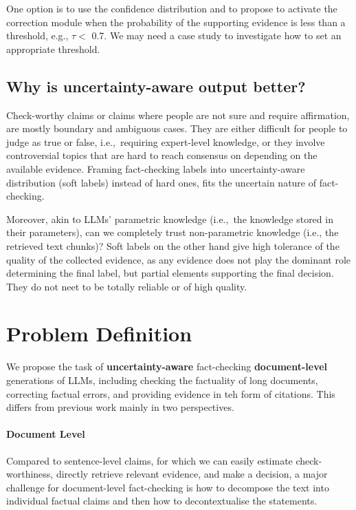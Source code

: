 \documentclass[11pt]{article}
\begin{document}
One option is to use the confidence distribution and to propose to activate the correction module when the probability of the supporting evidence is less than a threshold, e.g., $\tau<$ 0.7.
We may need a case study to investigate how to set an appropriate threshold.


\subsection{Why is uncertainty-aware output better?}
Check-worthy claims or claims where people are not sure and require affirmation, are mostly boundary and ambiguous cases.
They are either difficult for people to judge as true or false, i.e.,~requiring expert-level knowledge, or they involve controversial topics that are hard to reach consensus on depending on the available evidence.
Framing fact-checking labels into uncertainty-aware distribution (soft labels) instead of hard ones, fits the uncertain nature of fact-checking.

Moreover, akin to LLMs' parametric knowledge (i.e.,~the knowledge stored in their parameters), can we completely trust non-parametric knowledge (i.e., the retrieved text chunks)?
Soft labels on the other hand give high tolerance of the quality of the collected evidence, as any evidence does not play the dominant role determining the final label, but partial elements supporting the final decision.
They do not neet to be totally reliable or of high quality. 


\section{Problem Definition}
We propose the task of \textbf{uncertainty-aware} fact-checking \textbf{document-level} generations of LLMs, including checking the factuality of long documents, correcting factual errors, and providing evidence in teh form of citations.
This differs from previous work mainly in two perspectives.

\paragraph{Document Level}
Compared to sentence-level claims, for which we can easily estimate check-worthiness, directly retrieve relevant evidence, and make a decision, a major challenge for document-level fact-checking is how to decompose the text into individual factual claims and then how to decontextualise the statements.
\end{document}
